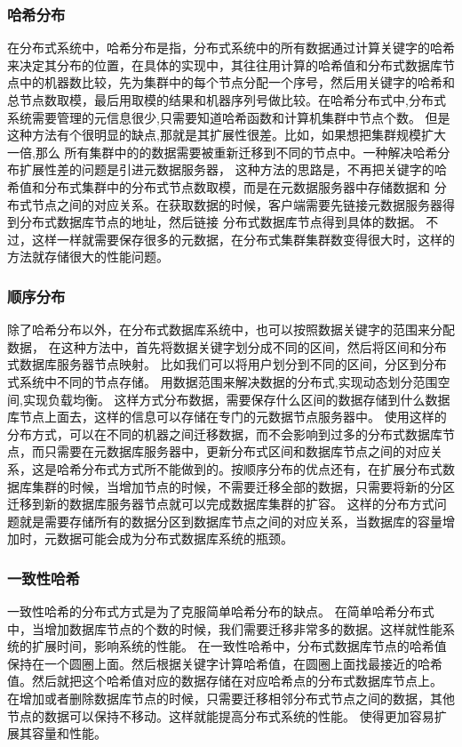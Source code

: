 \subsubsection{哈希分布}
在分布式系统中，哈希分布是指，分布式系统中的所有数据通过计算关键字的哈希来决定其分布的位置，在具体的实现中，其往往用计算的哈希值和分布式数据库节点中的机器数比较，先为集群中的每个节点分配一个序号，然后用关键字的哈希和总节点数取模，最后用取模的结果和机器序列号做比较。在哈希分布式中,分布式系统需要管理的元信息很少,只需要知道哈希函数和计算机集群中节点个数。 
但是这种方法有个很明显的缺点,那就是其扩展性很差。比如，如果想把集群规模扩大一倍,那么
所有集群中的的数据需要被重新迁移到不同的节点中。一种解决哈希分布扩展性差的问题是引进元数据服务器， 
这种方法的思路是，不再把关键字的哈希值和分布式集群中的分布式节点数取模，而是在元数据服务器中存储数据和
分布式节点之间的对应关系。在获取数据的时候，客户端需要先链接元数据服务器得到分布式数据库节点的地址，然后链接
分布式数据库节点得到具体的数据。
不过，这样一样就需要保存很多的元数据，在分布式集群集群数变得很大时，这样的方法就存储很大的性能问题。
\subsubsection{顺序分布}
除了哈希分布以外，在分布式数据库系统中，也可以按照数据关键字的范围来分配数据，
在这种方法中，首先将数据关键字划分成不同的区间，然后将区间和分布式数据库服务器节点映射。
比如我们可以将用户划分到不同的区间，分区到分布式系统中不同的节点存储。
用数据范围来解决数据的分布式,实现动态划分范围空间,实现负载均衡。 
这样方式分布数据，需要保存什么区间的数据存储到什么数据库节点上面去，这样的信息可以存储在专门的元数据节点服务器中。  
使用这样的分布方式，可以在不同的机器之间迁移数据，而不会影响到过多的分布式数据库节点，而只需要在元数据库服务器中，更新分布式区间和数据库节点之间的对应关系，这是哈希分布式方式所不能做到的。按顺序分布的优点还有，在扩展分布式数据库集群的时候，当增加节点的时候，不需要迁移全部的数据，只需要将新的分区迁移到新的数据库服务器节点就可以完成数据库集群的扩容。
这样的分布方式问题就是需要存储所有的数据分区到数据库节点之间的对应关系，当数据库的容量增加时，元数据可能会成为分布式数据库系统的瓶颈。
\subsubsection{一致性哈希}
一致性哈希的分布式方式是为了克服简单哈希分布的缺点。
在简单哈希分布式中，当增加数据库节点的个数的时候，我们需要迁移非常多的数据。这样就性能系统的扩展时间，影响系统的性能。
在一致性哈希中，分布式数据库节点的哈希值保持在一个圆圈上面。然后根据关键字计算哈希值，在圆圈上面找最接近的哈希值。然后就把这个哈希值对应的数据存储在对应哈希点的分布式数据库节点上。
在增加或者删除数据库节点的时候，只需要迁移相邻分布式节点之间的数据，其他节点的数据可以保持不移动。这样就能提高分布式系统的性能。
使得更加容易扩展其容量和性能。 
